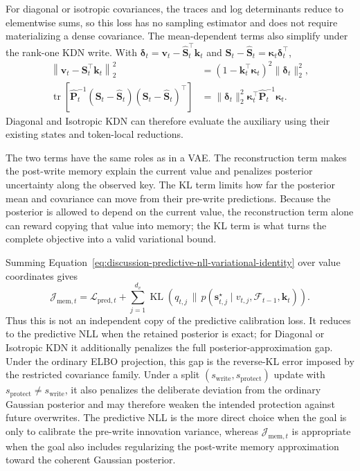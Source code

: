 \documentclass[11pt]{article}
\newcommand{\vct}[1]{\boldsymbol{#1}}
\begin{document}
For diagonal or isotropic covariances, the traces and log determinants reduce to elementwise sums,
so this loss has no sampling estimator and does not require materializing a dense covariance.
The mean-dependent terms also simplify under the rank-one KDN write. With
$\vct{\delta}_t=\vct{v}_t-\widehat{\vct{S}}_t^\top\vct{k}_t$ and
$\vct{S}_t-\widehat{\vct{S}}_t=\vct{\kappa}_t\vct{\delta}_t^\top$,
\begin{equation}
\begin{aligned}
  \left\|\vct{v}_t-\vct{S}_t^\top\vct{k}_t\right\|_2^2
  &=\left(1-\vct{k}_t^\top\vct{\kappa}_t\right)^2
    \|\vct{\delta}_t\|_2^2, \\
  \operatorname{tr}\!\left[
    \widehat{\vct{P}}_t^{-1}
    (\vct{S}_t-\widehat{\vct{S}}_t)
    (\vct{S}_t-\widehat{\vct{S}}_t)^\top
  \right]
  &=\|\vct{\delta}_t\|_2^2
    \vct{\kappa}_t^\top
    \widehat{\vct{P}}_t^{-1}\vct{\kappa}_t.
\end{aligned}
  \label{eq:discussion-memory-rank-one-loss}
\end{equation}
Diagonal and Isotropic KDN can therefore evaluate the auxiliary using their existing states and
token-local reductions.

The two terms have the same roles as in a VAE. The reconstruction term makes the post-write memory
explain the current value and penalizes posterior uncertainty along the observed key. The KL term
limits how far the posterior mean and covariance can move from their pre-write predictions.
Because the posterior is allowed to depend on the current value, the reconstruction term alone can
reward copying that value into memory; the KL term is what turns the complete objective into a
valid variational bound.

Summing Equation~\eqref{eq:discussion-predictive-nll-variational-identity} over value coordinates
gives
\begin{equation}
  \mathcal{J}_{\mathrm{mem},t}
  =\mathcal{L}_{\mathrm{pred},t}
  +\sum_{j=1}^{d_v}
    \operatorname{KL}\!\left(
      q_{t,j}\,\|\,
      p(\vct{s}_{t,j}^{\star}\mid
        v_{t,j},\mathcal{F}_{t-1},\vct{k}_t)
    \right).
  \label{eq:discussion-memory-elbo-identity}
\end{equation}
Thus this is not an independent copy of the predictive calibration loss. It reduces to the
predictive NLL when the retained posterior is exact; for Diagonal or Isotropic KDN it additionally
penalizes the full posterior-approximation gap. Under the ordinary ELBO projection, this gap is
the reverse-KL error imposed by the restricted covariance family. Under a split
$(s_{\mathrm{write}},s_{\mathrm{protect}})$ update with $s_{\mathrm{protect}}\ne
s_{\mathrm{write}}$, it also penalizes the deliberate deviation from the ordinary Gaussian
posterior and may therefore weaken the intended protection against future overwrites. The
predictive NLL is the more direct choice when the goal is only to calibrate the pre-write
innovation variance, whereas $\mathcal{J}_{\mathrm{mem},t}$ is appropriate when the goal also
includes regularizing the post-write memory approximation toward the coherent Gaussian posterior.
\end{document}

